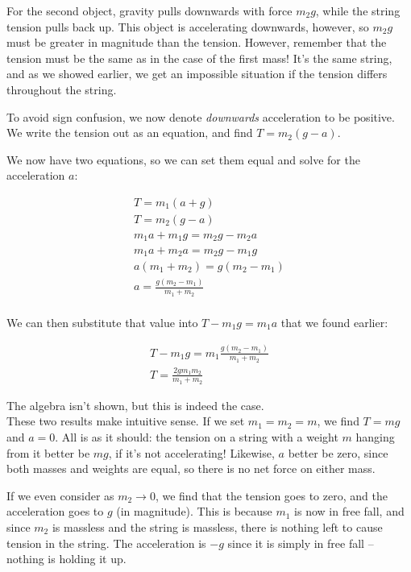 For the second object, gravity pulls downwards with force $m_2 g$, while the string tension pulls back up. This object is accelerating downwards, however, so $m_2 g$ must be greater in magnitude than the tension. However, remember that the tension must be the same as in the case of the first mass! It's the same string, and as we showed earlier, we get an impossible situation if the tension differs throughout the string.

To avoid sign confusion, we now denote \emph{downwards} acceleration to be positive. We write the tension out as an equation, and find $T = m_2 (g - a)$.

We now have two equations, so we can set them equal and solve for the acceleration $a$:

\begin{align}
T = m_1(a + g)\\
T = m_2(g - a)\\
m_1 a + m_1 g = m_2 g - m_2 a\\
m_1 a + m_2 a = m_2 g - m_1 g\\
a(m_1 + m_2) = g(m_2 - m_1)\\
a = \frac{g(m_2 - m_1)}{m_1 + m_2}\\
\end{align}

We can then substitute that value into $T - m_1 g = m_1 a$ that we found earlier:

\begin{align}
T - m_1 g = m_1  \frac{g(m_2 - m_1)}{m_1 + m_2}\\
T = \frac{2 g m_1 m_2}{m_1 + m_2}
\end{align}

The algebra isn't shown, but this is indeed the case.\\
These two results make intuitive sense. If we set $m_1 = m_2 = m$, we find $T = m g$ and $a = 0$. All is as it should: the tension on a string with a weight $m$ hanging from it better be $m g$, if it's not accelerating! Likewise, $a$ better be zero, since both masses and weights are equal, so there is no net force on either mass.

If we even consider as $m_2 \to 0$, we find that the tension goes to zero, and the acceleration goes to $g$ (in magnitude). This is because $m_1$ is now in free fall, and since $m_2$ is massless and the string is massless, there is nothing left to cause tension in the string. The acceleration is $-g$ since it is simply in free fall -- nothing is holding it up.

